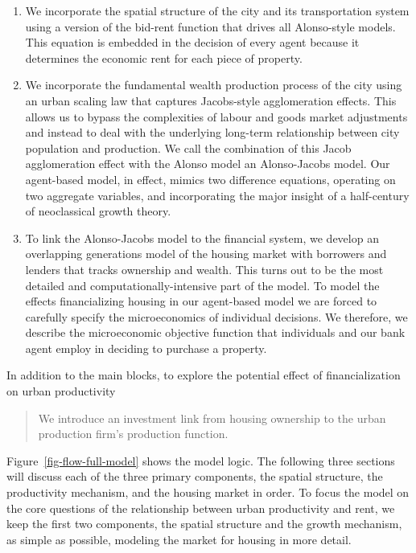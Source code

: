 \begin{enumerate}
\item We incorporate the spatial structure of the city and its transportation system using a version of the \gls{bid-rent function} that drives all Alonso-style models. This equation is embedded in the decision of every agent because it determines the economic rent for each piece of property.

\item We incorporate the fundamental wealth production process of the city using an \gls{urban scaling} law that captures Jacobs-style agglomeration effects. This allows us to bypass the complexities of labour and goods market adjustments and instead to deal with the underlying long-term relationship between city population and production. We call the combination of this Jacob agglomeration effect with the Alonso model an \gls{Alonso-Jacobs model}. Our \gls{agent-based model}, in effect, mimics two difference equations, operating on two aggregate variables, and incorporating the major insight of a half-century of \gls{neoclassical growth theory}.

\item To link the Alonso-Jacobs model to the financial system, we develop an \gls{overlapping generations} model of the housing market with borrowers and lenders that tracks ownership and wealth. This turns out to be the most detailed and computationally-intensive part of the model. To model the effects financializing housing in our \gls{agent-based model} we are forced to carefully specify the microeconomics of individual decisions. %
We therefore, we describe the microeconomic objective function that individuals and our bank agent employ in deciding to purchase a property. 
\end{enumerate}
In addition to the main blocks, to explore the potential effect of financialization on urban productivity 
\begin{quotation}\noindent We introduce an investment link from housing ownership to the urban production firm's production function.
\end{quotation}




Figure~\ref{fig-flow-full-model} shows the model logic.  The following three sections will discuss each of the three primary components, the spatial structure, the productivity mechanism, and the housing market in order.  To focus the model on the core questions of the relationship between urban productivity and rent, we keep the first two components,  the spatial structure and the growth mechanism,  as simple as possible, modeling the market for housing in more detail. 

